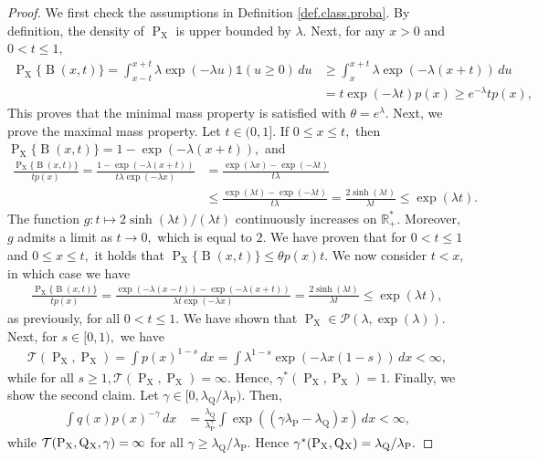 \documentclass[10pt]{article}
\newcommand{\mP}{\mathcal{P}}
\newcommand{\mT}{\mathcal{T}}
\newcommand{\RR}{\mathbb{R}}
\newcommand{\B}{\operatorname{B}}
\renewcommand{\P}{\operatorname{P}}
\newcommand{\Q}{\operatorname{Q}}
\newcommand{\sX}{\mathrm{X}}
\begin{document}
\begin{proof}
    We first check the assumptions in Definition \ref{def.class.proba}. By definition, the density of $\P_{\sX}$ is upper bounded by $\lambda.$ Next, for any $x > 0$ and $0 < t \leq 1,$
    \begin{align*}
        \P_{\sX}\{\B(x, t)\} = \int_{x - t}^{x + t} \lambda\exp(-\lambda u)\mathds{1}(u \geq 0)\, du &\geq \int_x^{x + t}\lambda\exp(-\lambda (x + t))\, du\\
        &= t\exp(-\lambda t)p(x) \geq e^{-\lambda}tp(x),
    \end{align*}
    This proves that the minimal mass property is satisfied with $\theta = e^\lambda.$ Next, we prove the maximal mass property. Let $t \in (0, 1].$ If $0 \leq x \leq t,$ then $\P_{\sX}\{\B(x, t)\} = 1 - \exp(-\lambda(x + t)),$ and
    \begin{align*}
        \frac{\P_{\sX}\{\B(x, t)\}}{tp(x)} = \frac{1 - \exp(-\lambda(x + t))}{t\lambda\exp(-\lambda x)} &= \frac{\exp(\lambda x) - \exp(-\lambda t)}{t\lambda}\\
        &\leq \frac{\exp(\lambda t) - \exp(-\lambda t)}{t\lambda} = \frac{2\sinh(\lambda t)}{\lambda t} \leq \exp(\lambda t).
    \end{align*}
    The function $g \colon t \mapsto 2\sinh(\lambda t)/(\lambda t)$ continuously increases on $\RR_+^*.$ Moreover, $g$ admits a limit as $t \to 0,$ which is equal to $2.$ We have proven that for $0 < t \leq 1$ and $0\leq x \leq t,$ it holds that $\P_{\sX}\{\B(x, t)\} \leq \theta p(x)t.$ We now consider $t < x,$ in which case we have
    \begin{align*}
        \frac{\P_{\sX}\{\B(x, t)\}}{tp(x)} = \frac{\exp(-\lambda(x - t)) - \exp(-\lambda(x + t))}{\lambda t \exp(-\lambda x)} = \frac{2\sinh(\lambda t)}{\lambda t} \leq \exp(\lambda t),
    \end{align*}
    as previously, for all $0 < t \leq 1.$ We have shown that $\P_{\sX} \in \mP(\lambda, \exp(\lambda)).$ Next, for $s \in [0, 1),$ we have
    \begin{align*}
        \mT(\P_{\sX}, \P_{\sX}) = \int p(x)^{1-s}\, dx = \int \lambda^{1-s} \exp(-\lambda x (1 - s))\, dx  < \infty,
    \end{align*}
    while for all $s \geq 1, \mT(\P_{\sX}, \P_{\sX}) = \infty.$ Hence, $\gamma^*(\P_{\sX}, \P_{\sX}) = 1.$ Finally, we show the second claim. Let $\gamma \in [0, \lambda_{\Q}/\lambda_{\P}).$ Then,
    \begin{align*}
        \int q(x)p(x)^{-\gamma}\, dx &= \frac{\lambda_{\Q}}{\lambda_{\P}^{\gamma}} \int \exp((\gamma\lambda_{\P} - \lambda_{\Q})x)\, dx < \infty,
    \end{align*}
    while $\mT(\P_{\sX}, \Q\mathstrut_{\!\sX}, \gamma) = \infty$ for all $\gamma \geq \lambda_{\Q}/\lambda_{\P}.$ Hence $\gamma^*(\P_{\sX}, \Q\mathstrut_{\!\sX}) = \lambda_{\Q}/\lambda_{\P}.$
\end{proof}
\end{document}
